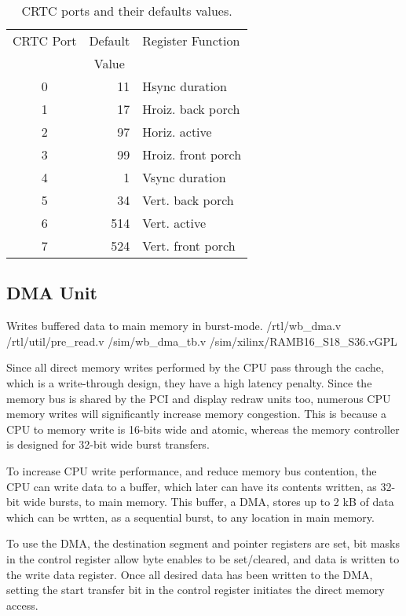 \begin{table}[h!]
\begin{center}
\begin{tabular}{c r l}
CRTC Port	& \multicolumn{1}{c}{Default}	&	Register Function	\\
			& \multicolumn{1}{c}{Value}	&						\\
\hline
0			&	11			&	Hsync duration		\\
1			&	17			&	Hroiz. back porch	\\
2			&	97			&	Horiz. active		\\
3			&	99			&	Hroiz. front porch	\\
4			&	1			&	Vsync duration		\\
5			&	34			&	Vert. back porch	\\
6			&	514			&	Vert. active		\\
7			&	524			&	Vert. front porch	\\
\end{tabular}
\caption[CRTC ports and their defaults values]{CRTC ports and their defaults
values.}
\label{TTAPROG_CRTC_Ports}
\end{center}
\end{table}


\subsection{DMA Unit}
\label{TTAPROG_DMA}

%
{Writes buffered data to main memory in burst-mode.}%
{/rtl/wb\_dma.v /rtl/util/pre\_read.v}%
{/sim/wb\_dma\_tb.v /sim/xilinx/RAMB16\_S18\_S36.v}{GPL}

Since all direct memory writes performed by the CPU pass through the cache,
which is a write-through design, they have a high latency penalty. Since the
memory bus is shared by the PCI and display redraw units too, numerous CPU
memory writes will significantly increase memory congestion. This is because a
CPU to memory write is 16-bits wide and atomic, whereas the memory controller
is designed for 32-bit wide burst transfers.

To increase CPU write performance, and reduce memory bus contention, the CPU
can write data to a buffer, which later can have its contents written, as
32-bit wide bursts, to main memory. This buffer, a DMA, stores up to 2 kB of
data which can be wrtten, as a sequential burst, to any location in main memory.

To use the DMA, the destination segment and pointer registers are set, bit
masks in the control register allow byte enables to be set/cleared, and data is
written to the write data register. Once all desired data has been written to
the DMA, setting the start transfer bit in the control register initiates the
direct memory access.


